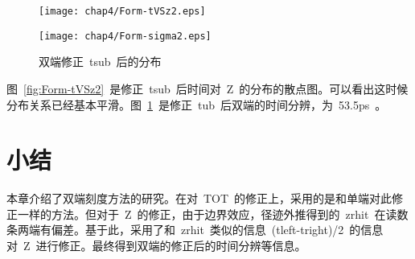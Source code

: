 \begin{figure}[!h]
\begin{minipage}[!h]{0.5\linewidth}
\texttt{[image: chap4/Form-tVSz2.eps]}
\label{fig:Form-tVSz2}
\end{minipage}%
\hfill
\begin{minipage}[!h]{0.5\linewidth}
\texttt{[image: chap4/Form-sigma2.eps]}
\label{fig:Form-sigma2}
\end{minipage}
\caption{双端修正~tsub~后的分布}
\end{figure}

图~\ref{fig:Form-tVSz2}~是修正~tsub~后时间对~Z~的分布的散点图。可以看出这时候分布关系已经基本平滑。图~\ref{fig:Form-sigma2}~是修正~tub~后双端的时间分辨，为~53.5ps~。

\section{小结}

本章介绍了双端刻度方法的研究。在对~TOT~的修正上，采用的是和单端对此修正一样的方法。但对于~Z~的修正，由于边界效应，径迹外推得到的~zrhit~在读数条两端有偏差。基于此，采用了和~zrhit~类似的信息~(tleft-tright)/2~的信息对~Z~进行修正。最终得到双端的修正后的时间分辨等信息。











